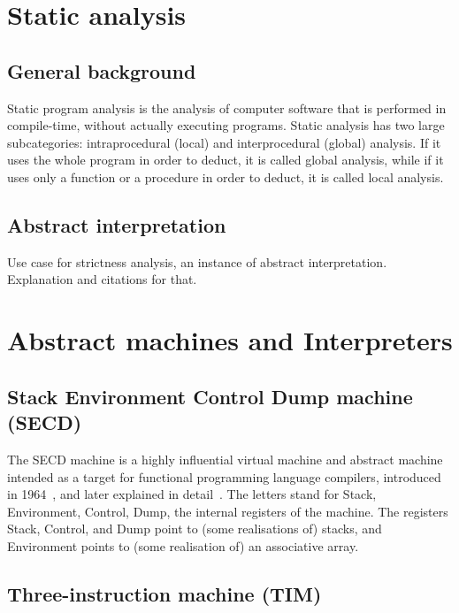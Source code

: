 \documentclass[diploma]{softlab-thesis}
\begin{document}
\section {Static analysis}
\label{sec:static-analysis}

\subsection{General background}

Static program analysis is the analysis of computer software that is performed in compile-time, without 
actually executing programs. Static analysis has two large subcategories: intraprocedural (local) and 
interprocedural (global) analysis. If it uses the whole program in order to deduct, it is called 
global analysis, while if it uses only a function or a procedure in order to deduct, it is called 
local analysis. 

\subsection{Abstract interpretation}

Use case for strictness analysis, an instance of 
abstract interpretation. Explanation and citations
for that.

\section{Abstract machines and Interpreters}
\label{sec:abstract-machines}

\subsection {Stack Environment Control Dump machine (SECD)}
\label{sec:secd}

The SECD machine is a highly influential virtual machine and abstract 
machine intended as a target for functional programming 
language compilers, introduced in 1964~\cite{La64}, and later explained
in detail~\cite{Danvy:2004:RDL:2154439.2154443}. The letters stand for Stack, Environment, 
Control, Dump, the internal registers of the machine. 
The registers Stack, Control, and Dump point to (some 
realisations of) stacks, and Environment points to (some 
realisation of) an associative array.

\subsection{Three-instruction machine (TIM)}
\label{sec:tim}
\end{document}
